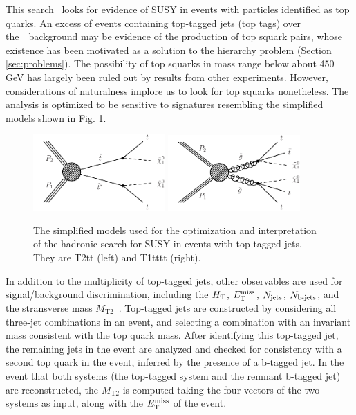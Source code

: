 This search~\cite{CMS:2016nhb} looks for evidence of SUSY in events with particles identified as top quarks. An excess of events containing top-tagged jets (top tags) over the~\sm~background may be evidence of the production of top squark pairs, whose existence has been motivated as a solution to the hierarchy problem (Section \ref{sec:problems}).  The possibility of top squarks in mass range below about 450 GeV has largely been ruled out by results from other experiments.  However, considerations of naturalness implore us to look for top squarks nonetheless. The analysis is optimized to be sensitive to signatures resembling the simplified models shown in Fig. \ref{fig:hadstopSMS}.
\begin{figure}[h]
\centering
\includegraphics[width=0.45\textwidth]{figures/SusySearches/HadStop2015/T2tt.pdf}
\includegraphics[width=0.45\textwidth]{figures/SusySearches/HadStop2015/T1tttt.pdf}\\
\caption{
  The simplified models used for the optimization and interpretation of the hadronic search for SUSY in events with top-tagged jets.
  They are T2tt (left) and T1tttt (right).
}
\label{fig:hadstopSMS}
\end{figure}


In addition to the multiplicity of top-tagged jets, other observables are used for signal/background discrimination, including the $H_{\rm T}$, $E_{\text{T}}^{\rm miss}$, $N_{\rm jets}$, $N_{\text{b-jets}}$, and the stransverse mass $M_{\text{T2}}$~\cite{Lester:1999tx}. Top-tagged jets are constructed by considering all three-jet combinations in an event, and selecting a combination with an invariant mass consistent with the top quark mass. After identifying this top-tagged jet, the remaining jets in the event are analyzed and checked for consistency with a second top quark in the event, inferred by the presence of a b-tagged jet. In the event that both systems (the top-tagged system and the remnant b-tagged jet) are reconstructed, the $M_{\text{T2}}$ is computed taking the four-vectors of the two systems as input, along with the $E_{\text{T}}^{\rm miss}$ of the event. 

